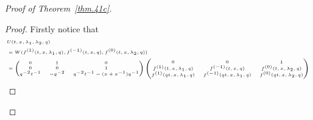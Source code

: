 \documentclass[12pt,reqno]{amsart}
\theoremstyle{definition}
\def\be{\begin{equation}}
\def\ee{\end{equation}}
\begin{document}
\begin{proof}[Proof of Theorem~\ref{thm.41c}]
\begin{proof}
Firstly notice that
\be
\begin{tiny}
\begin{aligned}
&U(t,x,\lambda_{1},\lambda_{2},q)\\
&=
W(f^{(1)}(t,x,\lambda_{1},q),f^{(-1)}(t,x,q),f^{(0)}(t,x,\lambda_{2},q))\\
&=
\begin{pmatrix}
0 & 1 & 0\\
0 & 0 & 1\\
q^{-2}t^{-1} & -q^{-2} & q^{-2}t^{-1}-(x+x^{-1})q^{-1}
\end{pmatrix}
\begin{pmatrix}
0 & 0 & 1\\
f^{(1)}(t,x,\lambda_{1},q) & f^{(-1)}(t,x,q) & f^{(0)}(t,x,\lambda_{2},q)\\
f^{(1)}(qt,x,\lambda_{1},q) & f^{(-1)}(qt,x,\lambda_{1},q) &
f^{(0)}(qt,x,\lambda_{2},q)
\end{pmatrix}
\end{aligned}
\end{tiny}
\ee


\end{proof}
\end{proof}
\end{document}
